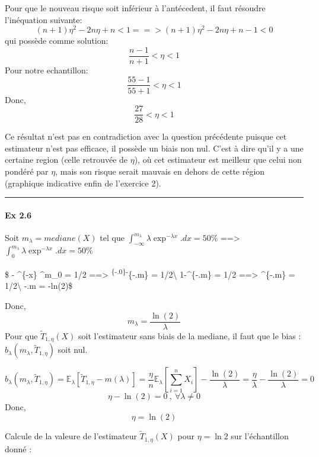 \documentclass[11pt]{article}
\begin{document}
Pour que le nouveau risque soit inférieur à l'antécedent, il faut
résoudre l'inéquation suivante:
\[(n+1)\eta^2-2 n\eta +n < 1 ==> (n+1)\eta^2-2 n\eta + n-1 < 0\] qui
possède comme solution: \[ \frac{n-1}{n+1}<\eta<1\] Pour notre
echantillon: \[ \frac{55-1}{55+1}<\eta<1 \] Donc,
\[\frac{27}{28}<\eta<1\]

Ce résultat n'est pas en contradiction avec la question précédente
puisque cet estimateur n'est pas efficace, il possède un biais non nul.
C'est à dire qu'il y a une certaine region (celle retrouvée de
\(\eta\)), où cet estimateur est meilleur que celui non pondéré par
\(\eta\), mais son risque serait mauvais en dehors de cette région
(graphique indicative enfin de l'exercice 2).

    \begin{center}\rule{0.5\linewidth}{\linethickness}\end{center}

\paragraph{Ex 2.6}\label{ex-2.6}

    Soit \(m_\lambda = mediane(X)\) tel que
\(\int_{-\infty}^{m_\lambda}\lambda\exp^{-\lambda x}.dx = 50\%\)
==\textgreater{}
\(\int_{0}^{m_\lambda}\lambda\exp^{-\lambda x}.dx = 50\%\)

\$ - \exp\^{}\{-\lambda x\} \textbar{}\^{}m\_0 = 1/2 ==\textgreater{}
\exp\textsuperscript{\{-\lambda .0\}-\exp}\{-\lambda .m\} =
1/2\textbackslash{} 1-\exp\^{}\{-\lambda .m\} = 1/2 ==\textgreater{}
\exp\^{}\{-\lambda .m\} = 1/2\textbackslash{} -\lambda .m = -ln(2)\$

Donc, \[m_\lambda = \frac{\ln(2)}{\lambda}\] Pour que
\(\tilde{T}_{1,\eta}(X)\) soit l'estimateur sans biais de la mediane, il
faut que le bias : \(b_\lambda(m_\lambda,\tilde{T}_{1,\eta})\) soit nul.

\[b_\lambda(m_\lambda,\tilde{T}_{1,\eta}) = \mathbb{E}_\lambda[\tilde{T}_{1,\eta}-m(\lambda)] = \frac{\eta}{n}\mathbb{E}_\lambda[\sum_{i=1}^nX_i] - \frac{\ln(2)}{\lambda} = \frac{\eta}{\lambda}- \frac{\ln(2)}{\lambda} = 0\]
\[\eta - \ln(2) = 0\ ,\ \forall \lambda \neq 0\] Donc,\[\eta = \ln(2)\]

    Calcule de la valeure de l'estimateur \(\tilde{T}_{1,\eta}(X)\) pour
\(\eta = \ln{2}\) sur l'échantillon donné :
\end{document}
